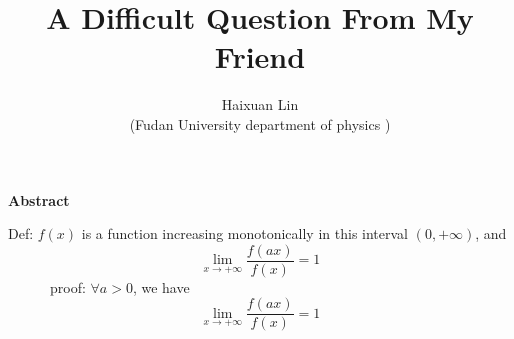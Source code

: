 \documentclass[12pt,a4paper]{article}%
\title{\fontsize{18pt}{27pt}\selectfont%
	{\heiti%
		A Difficult Question From My Friend}}%
\author{\fontsize{12pt}{18pt}\selectfont%
	{\fangsong%
		Haixuan Lin}\\%
	\fontsize{10.5pt}{15.75pt}\selectfont%
	{\fangsong%
		(Fudan University department of physics
		)}}%
\date{}%
\begin{document}
	\maketitle%
	\lhead{}%
	\chead{}%
	\rhead{}%
	\lfoot{}%
	\cfoot{\thepage}%
	\rfoot{}%
	
	\begin{center}%
		{\textbf{Abstract}}%
	\end{center}
	\begin{adjustwidth}{1.06cm}{1.06cm}%
		\hspace{1.5em}
	\noindent Def: $f(x)$ is a function increasing monotonically in this interval $(0,+\infty)$, and
	\begin{equation*}
		\lim_{x\rightarrow +\infty} \frac{f\left( ax \right)}{f\left( x \right)}=1
    \end{equation*}
	\ \ \ \ \ \ proof: $\forall a>0$, we have
	\begin{equation*}
		\lim_{x\rightarrow+\infty}\frac{f(ax)}{f(x)}=1
	\end{equation*}
	\end{adjustwidth}
\end{document}
